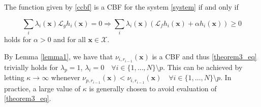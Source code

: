 \begin{theorem}
The function given by \eqref{ccbf} is a CBF for the system \eqref{system} if and only if~\cite{compositeCBFames}

\small
\begin{equation}\label{theorem3_eq}
    \sum_i \lambda_i(\mathbf{x}) \mathcal{L}_g h_i(\mathbf{x}) = 0 \Longrightarrow \sum_i \lambda_i(\mathbf{x}) (\mathcal{L}_f h_i(\mathbf{x}) + \alpha  h_i(\mathbf{x})) \geq 0
\end{equation}
\normalsize
holds for $\alpha > 0$ and for all $\mathbf{x} \in \mathcal{X}$.
\end{theorem}

\begin{remark}\label{rmrk1}
By Lemma \ref{lemma1}, we have that $\nu_{i,r_{i-1}}(\mathbf{x})$ is a CBF and thus \eqref{theorem3_eq} trivially holds for $\lambda_p = 1$, $\lambda_i = 0 \quad \forall i \in \{1, \hdots ,N \} \setminus p$. This can be achieved by letting $\kappa \rightarrow \infty$ whenever $\nu_{p,r_{i-1}}(\mathbf{x}) < \nu_{i,r_{i-1}}(\mathbf{x}) \quad \forall i \in \{1, \hdots ,N \} \setminus p$. In practice, a large value of $\kappa$ is generally chosen to avoid evaluation of \eqref{theorem3_eq}. 
\end{remark}